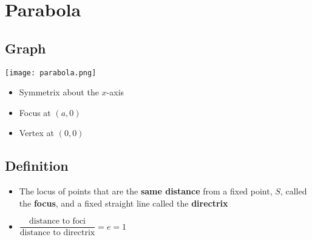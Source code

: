


\section{Parabola}
\subsection{Graph}
\texttt{[image: parabola.png]}
\begin{itemize}
    \item Symmetrix about the $x$-axis
    \item Focus at $(a, 0)$
    \item Vertex at $(0, 0)$
\end{itemize}
\subsection{Definition}
\begin{itemize}
    \item The locus of points that are the \textbf{same distance} from a fixed point, $S$, 
    called the \textbf{focus}, and a fixed straight line called the \textbf{directrix}
    \item $\dfrac{\text{distance to foci}}{\text{distance to directrix}} = e = 1$
\end{itemize}
